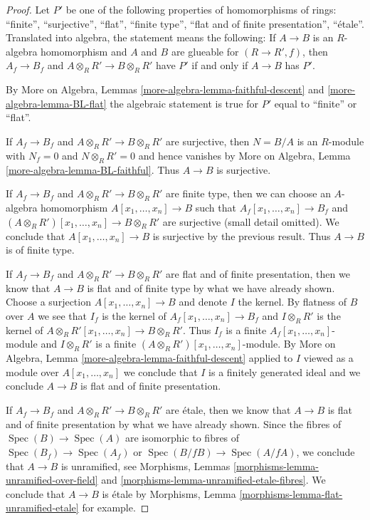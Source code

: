 \documentclass[10pt,a4paper]{amsart}
\theoremstyle{plain}
\theoremstyle{definition}
\theoremstyle{remark}
\numberwithin{equation}{subsection}
\def\Spec{\mathop{\mathrm{Spec}}}
\begin{document}
\begin{proof}
Let $P'$ be one of the following properties of homomorphisms of rings:
``finite'', ``surjective'', ``flat'', ``finite type'',
``flat and of finite presentation'', ``\'etale''.
Translated into algebra, the statement means the following:
If $A \to B$ is an $R$-algebra homomorphism and $A$ and $B$
are glueable for $(R \to R', f)$, then
$A_f \to B_f$ and $A \otimes_R R' \to B \otimes_R R'$ have $P'$
if and only if $A \to B$ has $P'$.

\medskip\noindent
By More on Algebra, Lemmas \ref{more-algebra-lemma-faithful-descent}
and \ref{more-algebra-lemma-BL-flat} the algebraic statement
is true for $P'$ equal to ``finite'' or ``flat''.

\medskip\noindent
If $A_f \to B_f$ and $A \otimes_R R' \to B \otimes_R R'$ are surjective,
then $N = B/A$ is an $R$-module with $N_f = 0$ and $N \otimes_R R' = 0$ and
hence vanishes by More on Algebra, Lemma
\ref{more-algebra-lemma-BL-faithful}. Thus $A \to B$ is surjective.

\medskip\noindent
If $A_f \to B_f$ and $A \otimes_R R' \to B \otimes_R R'$ are finite type,
then we can choose an $A$-algebra homomorphism $A[x_1, \ldots, x_n] \to B$
such that $A_f[x_1, \ldots, x_n] \to B_f$ and
$(A \otimes_R R')[x_1, \ldots, x_n] \to B \otimes_R R'$ are surjective
(small detail omitted). We conclude that $A[x_1, \ldots, x_n] \to B$
is surjective by the previous result. Thus $A \to B$ is of finite type.

\medskip\noindent
If $A_f \to B_f$ and $A \otimes_R R' \to B \otimes_R R'$ are
flat and of finite presentation, then we know that $A \to B$ is flat and
of finite type by what we have already shown. Choose a surjection
$A[x_1, \ldots, x_n] \to B$ and denote $I$ the kernel.
By flatness of $B$ over $A$ we see that $I_f$ is the kernel of
$A_f[x_1, \ldots, x_n] \to B_f$ and $I \otimes_R R'$ is the kernel of
$A \otimes_R R'[x_1, \ldots, x_n] \to B \otimes_R R'$.
Thus $I_f$ is a finite $A_f[x_1, \ldots, x_n]$-module and
$I \otimes_R R'$ is a finite $(A \otimes_R R')[x_1, \ldots, x_n]$-module.
By More on Algebra, Lemma \ref{more-algebra-lemma-faithful-descent}
applied to $I$ viewed as a module over $A[x_1, \ldots, x_n]$
we conclude that $I$ is a finitely generated ideal and we conclude
$A \to B$ is flat and of finite presentation.

\medskip\noindent
If $A_f \to B_f$ and $A \otimes_R R' \to B \otimes_R R'$ are \'etale,
then we know that $A \to B$ is flat and of finite presentation by what
we have already shown. Since the fibres of $\Spec(B) \to \Spec(A)$
are isomorphic to fibres of $\Spec(B_f) \to \Spec(A_f)$ or
$\Spec(B/fB) \to \Spec(A/fA)$, we conclude that $A \to B$ is unramified,
see Morphisms, Lemmas \ref{morphisms-lemma-unramified-over-field}
and \ref{morphisms-lemma-unramified-etale-fibres}.
We conclude that $A \to B$ is \'etale by
Morphisms, Lemma \ref{morphisms-lemma-flat-unramified-etale} for example.
\end{proof}
\end{document}
